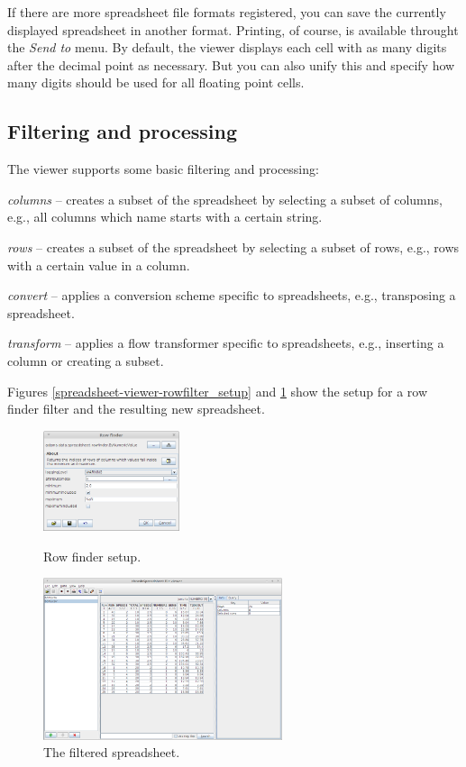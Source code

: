 \documentclass[a4paper]{book}
\begin{document}
If there are more spreadsheet file formats registered, you can save the
currently displayed spreadsheet in another format. Printing, of course, is
available throught the \textit{Send to} menu. By default, the viewer displays
each cell with as many digits after the decimal point as necessary. But you can
also unify this and specify how many digits should be used for all floating
point cells.

\clearpage
\subsection{Filtering and processing}
The viewer supports some basic filtering and processing:
\begin{tight_itemize}
	\item \textit{columns} -- creates a subset of the spreadsheet by selecting
	a subset of columns, e.g., all columns which name starts with a certain string.
	\item \textit{rows} -- creates a subset of the spreadsheet by selecting
	a subset of rows, e.g., rows with a certain value in a column.
	\item \textit{convert} -- applies a conversion scheme specific to 
	spreadsheets, e.g., transposing a spreadsheet.
	\item \textit{transform} -- applies a flow transformer specific to 
	spreadsheets, e.g., inserting a column or creating a subset.
\end{tight_itemize}
Figures \ref{spreadsheet-viewer-rowfilter_setup} and \ref{spreadsheet-viewer-rowfilter_result}
show the setup for a row finder filter and the resulting new spreadsheet.

\begin{figure}[ht]
  \begin{minipage}[t]{0.4\linewidth}
    \centering
    \includegraphics[width=4.0cm]{images/spreadsheet-viewer-rowfilter_setup.png}
    \caption{Row finder setup.}
    \label{spreadsheet-viewer-rowfilter_setup}
  \end{minipage}
  \hspace{0.5cm}
  \begin{minipage}[t]{0.6\linewidth}
    \centering
    \includegraphics[width=7.0cm]{images/spreadsheet-viewer-rowfilter_result.png}
    \caption{The filtered spreadsheet.}
    \label{spreadsheet-viewer-rowfilter_result}
  \end{minipage}
\end{figure}
\end{document}
